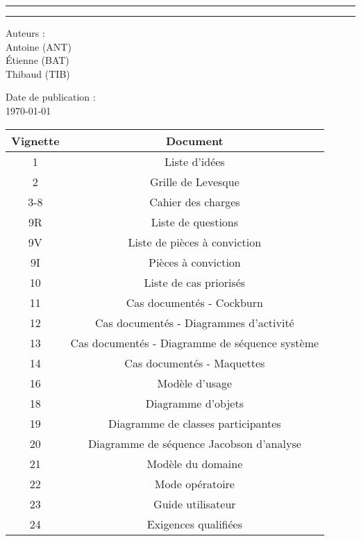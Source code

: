 \documentclass[a4paper, 12pt, french]{article}
\begin{document}
	\begin{center}
	    \rule{\linewidth}{1pt}
		\LARGE{}
	    \rule{\linewidth}{1pt} \newline{} \newline{}
	\end{center}
	\begin{center}
	    \large{Auteurs :}\\ Antoine  (ANT)\\ Étienne  (BAT) \\ Thibaud  (TIB)
	\end{center}
	\vspace{20px}
	\begin{center}
		\large{Date de publication :}\\ \today
	\end{center}

	\begin{longtable}{|c|c|}
 	\hline
 	Vignette & Document \\ \hline
 	\hline
	1 & Liste d'idées \\ \hline
	2 & Grille de Levesque  \\ \hline
	3-8 & Cahier des charges \\ \hline
	9R & Liste de questions \\ \hline
	9V & Liste de pièces à conviction \\ \hline
	9I & Pièces à conviction \\ \hline
	10 & Liste de cas priorisés \\ \hline
	11 & Cas documentés - Cockburn \\ \hline
	12 & Cas documentés - Diagrammes d'activité \\ \hline
	13 & Cas documentés - Diagramme de séquence système \\ \hline
	14 & Cas documentés - Maquettes \\ \hline
	16 & Modèle d’usage \\ \hline
	18 & Diagramme d’objets \\ \hline
	19 & Diagramme de classes participantes \\ \hline
	20 & Diagramme de séquence Jacobson d’analyse \\ \hline
	21 & Modèle du domaine \\ \hline
	22 & Mode opératoire \\ \hline
	23 & Guide utilisateur \\ \hline
	24 & Exigences qualifiées \\ \hline
	\end{longtable}
\end{document}
